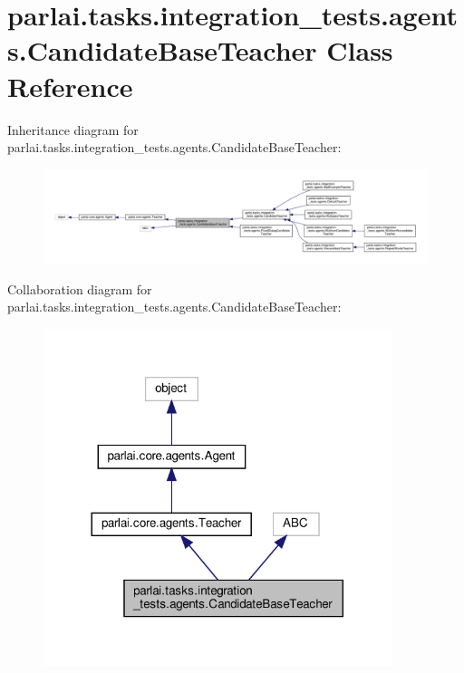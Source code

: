 \hypertarget{classparlai_1_1tasks_1_1integration__tests_1_1agents_1_1CandidateBaseTeacher}{}\section{parlai.\+tasks.\+integration\+\_\+tests.\+agents.\+Candidate\+Base\+Teacher Class Reference}
\label{classparlai_1_1tasks_1_1integration__tests_1_1agents_1_1CandidateBaseTeacher}


Inheritance diagram for parlai.\+tasks.\+integration\+\_\+tests.\+agents.\+Candidate\+Base\+Teacher\+:
\nopagebreak
\begin{figure}[H]
\begin{center}
\leavevmode
\includegraphics[width=350pt]{d4/d49/classparlai_1_1tasks_1_1integration__tests_1_1agents_1_1CandidateBaseTeacher__inherit__graph}
\end{center}
\end{figure}


Collaboration diagram for parlai.\+tasks.\+integration\+\_\+tests.\+agents.\+Candidate\+Base\+Teacher\+:
\nopagebreak
\begin{figure}[H]
\begin{center}
\leavevmode
\includegraphics[width=288pt]{de/db1/classparlai_1_1tasks_1_1integration__tests_1_1agents_1_1CandidateBaseTeacher__coll__graph}
\end{center}
\end{figure}
